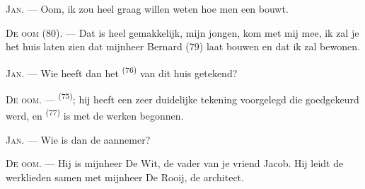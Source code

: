 %
%
%

\VUsaut{6.0mm}
\VUsaut{1.4mm}
\VUsaut{2.2mm}

\VUsaut{3.0mm}

\textsc{Jan}. --- Oom, ik zou heel graag willen weten hoe men een  bouwt.

\textsc{De oom} (80). --- Dat is heel gemakkelijk, mijn jongen, kom met mij mee, ik zal je het
huis laten zien dat mijnheer Bernard (79) laat bouwen en dat ik zal bewonen.

\textsc{Jan}. --- Wie heeft dan het  \textsuperscript{(76)} van dit huis
getekend?

\textsc{De oom}. ---  \textsuperscript{(75)}; hij heeft een zeer
duidelijke tekening voorgelegd die goedgekeurd werd, en 
\textsuperscript{(77)} is met de werken begonnen.

\textsc{Jan}. --- Wie is dan de aannemer?

\textsc{De oom}. --- Hij is mijnheer De Wit, de vader van je vriend Jacob. Hij leidt de
werklieden samen met mijnheer De Rooij, de architect.

